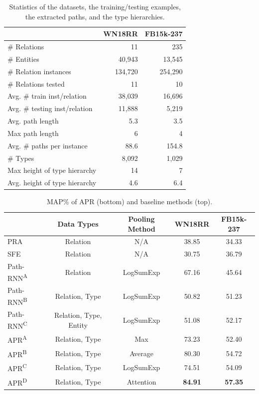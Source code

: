 \documentclass[letterpaper]{article} %
\begin{document}
\begin{table}
\centering
\begin{tabular}{lrr}  
\toprule
  & WN18RR & FB15k-237 \\
\midrule
\# Relations       & 11  &  235   \\
\# Entities            & 40,943  &   13,545   \\
\# Relation instances    &  134,720  &   254,290    \\
\midrule
\# Relations tested  & 11  &   10   \\
Avg. \# train inst/relation  & 38,039  &   16,696    \\
Avg. \# testing inst/relation  &  11,888 &   5,219    \\
\midrule
Avg. path length  & 5.3  &   3.5    \\
Max path length  & 6  &  4     \\
Avg. \# paths per instance & 88.6  &   154.8    \\
\midrule
\# Types & 8,092 & 1,029 \\
Max height of type hierarchy  & 14  &   7    \\
Avg. height of type hierarchy  & 4.6  &   6.4    \\
\bottomrule
\end{tabular}
\caption{Statistics of the datasets, the training/testing examples, the extracted paths, and the type hierarchies.}
\label{tab:data_stats}
\end{table}

\begin{table}[t]
\centering
\begin{tabular}{lcccc}  
\toprule
& Data Types & Pooling Method & WN18RR & FB15k-237 \\
\midrule
PRA  & Relation &  N/A   & 38.85 &  34.33   \\
SFE  & Relation & N/A   &  30.75 &  36.79  \\
Path-RNN\textsuperscript{A}  & Relation &  LogSumExp    &  67.16 &  45.64   \\
Path-RNN\textsuperscript{B}  & Relation, Type & LogSumExp  & 50.82  & 51.23    \\
Path-RNN\textsuperscript{C}  & Relation, Type, Entity  & LogSumExp & 51.08  & 52.17   \\
\midrule
APR\textsuperscript{A} & Relation, Type & Max   & 73.23  &  52.40  \\
APR\textsuperscript{B} & Relation, Type & Average & 80.30  &  54.72  \\
APR\textsuperscript{C} & Relation, Type & LogSumExp & 74.51  & 54.09   \\
APR\textsuperscript{D} & Relation, Type  & Attention   &  \textbf{84.91} &  \textbf{57.35}  \\
\bottomrule
\end{tabular}
\caption{MAP\% of APR (bottom) and baseline methods (top).}
\label{tab:results}
\end{table}
\end{document}
